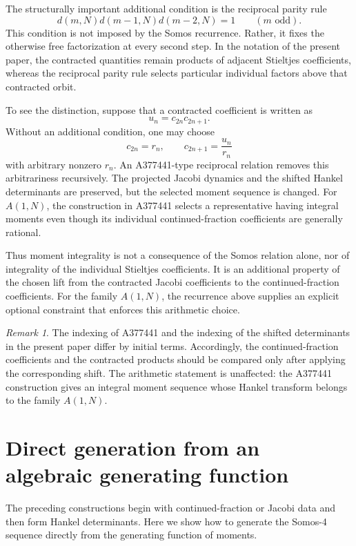 \documentclass[11pt]{article}
\theoremstyle{remark}
\newtheorem{remark}[theorem]{Remark}
\begin{document}
The structurally important additional condition is the reciprocal parity rule
\begin{equation}
 d(m,N)d(m-1,N)d(m-2,N)=1
 \qquad(m\text{ odd}).
\end{equation}
This condition is not imposed by the Somos recurrence. Rather, it fixes the
otherwise free factorization at every second step. In the notation of the
present paper, the contracted quantities remain products of adjacent
Stieltjes coefficients, whereas the reciprocal parity rule selects particular
individual factors above that contracted orbit.

To see the distinction, suppose that a contracted coefficient is written as
\[
 u_n=c_{2n}c_{2n+1}.
\]
Without an additional condition, one may choose
\[
 c_{2n}=r_n,\qquad c_{2n+1}=\frac{u_n}{r_n}
\]
with arbitrary nonzero $r_n$. An A377441-type reciprocal relation removes
this arbitrariness recursively. The projected Jacobi dynamics and the shifted
Hankel determinants are preserved, but the selected moment sequence is
changed. For $A(1,N)$, the construction in A377441 selects a representative
having integral moments even though its individual continued-fraction
coefficients are generally rational.

Thus moment integrality is not a consequence of the Somos relation alone, nor
of integrality of the individual Stieltjes coefficients. It is an additional
property of the chosen lift from the contracted Jacobi coefficients to the
continued-fraction coefficients. For the family $A(1,N)$, the recurrence above
supplies an explicit optional constraint that enforces this arithmetic choice.

\begin{remark}
The indexing of A377441 and the indexing of the shifted determinants in the
present paper differ by initial terms. Accordingly, the continued-fraction
coefficients and the contracted products should be compared only after
applying the corresponding shift. The arithmetic statement is unaffected:
the A377441 construction gives an integral moment sequence whose Hankel
transform belongs to the family $A(1,N)$.
\end{remark}


\section{Direct generation from an algebraic generating function}
\label{sec:algebraic-generating-function}

The preceding constructions begin with continued-fraction or Jacobi data and
then form Hankel determinants.  Here we show how to generate the Somos-4 sequence directly from the generating function of moments.
\end{document}
